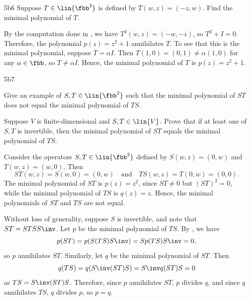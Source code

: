 \begin{exercise}{5b6}
    Suppose $T \in \lin{\fbb^2}$ is defined by $T(w, z) = (-z, w)$.
	Find the minimal polynomial of $T$.
\end{exercise}

\begin{sol}
    By the computation done in , we have $T^2(w, z) = (-w, -z)$, so $T^2 + I = 0$.
	Therefore, the polynomial $p(z) = z^2 + 1$ annihilates $T$.
	To see that this is the minimal polynomial, suppose $T = \alpha I$.
	Then $T(1, 0) = (0, 1) \neq \alpha(1, 0)$ for any $\alpha \in \fbb$, so $T \neq \alpha I$.
	Hence, the minimal polynomial of $T$ is $p(z) = z^2 + 1$.
\end{sol}

\begin{exercise}{5b7}
    \begin{subexercises}
        \item Give an example of $S, T \in \lin{\fbb^2}$ such that the minimal polynomial of $ST$ does not equal the minimal polynomial of $TS$.
        \item Suppose $V$ is finite-dimensional and $S, T \in \lin{V}$.
	Prove that if at least one of $S, T$ is invertible, then the minimal polynomial of $ST$ equals the minimal polynomial of $TS$.
    \end{subexercises}

\end{exercise}

\begin{solenum}
    \item Consider the operators $S, T \in \lin{\fbb^2}$ defined by $S(w, z) = (0, w)$ and $T(w, z) = (w, 0)$.
	Then
    \[
    	ST(w, z) = S(w, 0) = (0, w) \quad \text{and} \quad TS(w, z) = T(0, w) = (0, 0).
    \]
    The minimal polynomial of $ST$ is $p(z) = z^2$, since $ST \neq 0$ but $(ST)^2 = 0$, while the minimal polynomial of $TS$ is $q(z) = z$.
	Hence, the minimal polynomials of $ST$ and $TS$ are not equal.
    \item Without loss of generality, suppose $S$ is invertible, and note that $ST = STSS\inv$.
    Let $p$ be the minimal polynomial of $TS$.
    By , we have
    \[
        p(ST) = p(S(TS)S\inv) = Sp(TS)S\inv = 0,
    \]
    so $p$ annihilates $ST$.
    Similarly, let $q$ be the minimal polynomial of $ST$.
    Then
    \[
        q(TS) = q(S\inv(ST)S) = S\inv q(ST) S = 0
    \]
    as $TS = S\inv(ST)S$.
    Therefore, since $p$ annihilates $ST$, $p$ divides $q$, and since $q$ annihilates $TS$, $q$ divides $p$, so $p = q$.
\end{solenum}


